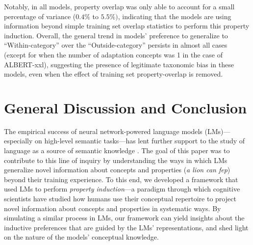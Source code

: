 \documentclass[10pt,letterpaper]{article}
\newcommand{\ake}[1]{\textcolor{blue}{$_{AE}$[#1]}}
\newcommand{\km}[1]{\textcolor{purple}{$_{KM}$[#1]}}
\begin{document}
Notably, in all models, property overlap was only able to account for a small percentage of variance ($0.4\%$ to $5.5\%)$, indicating that the models are using information beyond simple training set overlap statistics to perform this property induction.
Overall, the general trend in models' preference to generalize to ``Within-category'' over the ``Outside-category'' persists in almost all cases (except for when the number of adaptation concepts was 1 in the case of ALBERT-xxl), suggesting the presence of legitimate taxonomic bias in these models, even when the effect of training set property-overlap is removed.


\section{General Discussion and Conclusion}
The empirical success of neural network-powered language models (LMs)---especially on high-level semantic tasks---has lent further support to the study of language as a source of semantic knowledge \citep{elman2004alternative, lupyan2019words}.
The goal of this paper was to contribute to this line of inquiry by understanding the ways in which  LMs generalize novel information about concepts and properties (\textit{a lion can fep}) beyond their training experience.
To this end, we developed a framework that used LMs to perform \textit{property induction}---a paradigm through which cognitive scientists have studied how humans use their conceptual repertoire to project novel information about concepts and properties in systematic ways.
By simulating a similar process in LMs, our framework can yield insights about the inductive preferences that are guided by the LMs' representations, and shed light on the nature of the models' conceptual knowledge.
\end{document}
